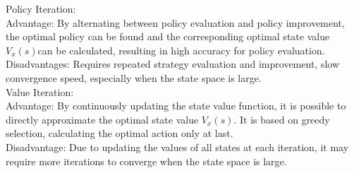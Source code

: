 \begin{homeworkProblem}
Policy Iteration: \\
Advantage: By alternating between policy evaluation and policy improvement, the optimal policy can be found and the corresponding optimal state value $V_x (s) $can be calculated, resulting in high accuracy for policy evaluation. \\
Disadvantages: Requires repeated strategy evaluation and improvement, slow convergence speed, especially when the state space is large. \\

Value Iteration: \\
Advantage: By continuously updating the state value function, it is possible to directly approximate the optimal state value $V_x (s) $. It is based on greedy selection, calculating the optimal action only at last. \\
Disadvantage: Due to updating the values of all states at each iteration, it may require more iterations to converge when the state space is large.

\end{homeworkProblem}

\newpage